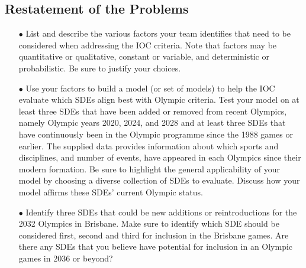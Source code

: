 \documentclass[a4paper]{article}
\begin{document}
\subsection{Restatement of the Problems}
\begin{itemize}
\item[$\bullet$]List and describe the various factors your team identifies that need to be
considered when addressing the IOC criteria. Note that factors may be quantitative or qualitative,
constant or variable, and deterministic or probabilistic. Be sure to justify your choices.
\item[$\bullet$]Use your factors to build a model (or set of models) to help the IOC evaluate
which SDEs align best with Olympic criteria. Test your model on at least three SDEs that have been added or removed from recent
Olympics, namely Olympic years 2020, 2024, and 2028 and at least three SDEs that have
continuously been in the Olympic programme since the 1988 games or earlier. The
supplied data provides information about which sports and
disciplines, and number of events, have appeared in each Olympics since their modern
formation. Be sure to highlight the general applicability of your model by choosing a
diverse collection of SDEs to evaluate. Discuss how your model affirms these SDEs'
current Olympic status.
\item[$\bullet$]Identify three SDEs that could be new additions or reintroductions for the 2032 Olympics
in Brisbane. Make sure to identify which SDE should be considered first, second and
third for inclusion in the Brisbane games. Are there any SDEs that you believe have
potential for inclusion in an Olympic games in 2036 or beyond?
\end{itemize}
\end{document}
